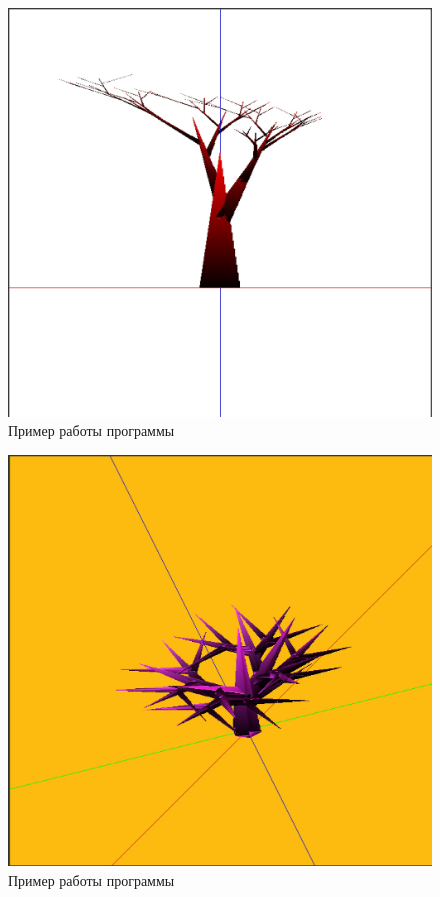 \documentclass[54pt, a4paper]{article}
\begin{document}
	\newpage
	
	\begin{figure}[ht!]
		\centering
		\includegraphics[scale=0.2]{img/ex1.JPG}
		\caption{Пример работы программы}
		\label{ris:ex1}
	\end{figure}

	\begin{figure}[ht!]
		\centering
		\includegraphics[scale=0.2]{img/ex2.JPG}
		\caption{Пример работы программы}
		\label{ris:ex2}
	\end{figure}
\end{document}
